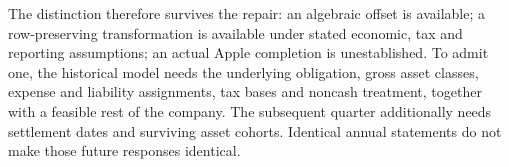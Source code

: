 The distinction therefore survives the repair: an algebraic offset is
available; a row-preserving transformation is available under stated
economic, tax and reporting assumptions; an actual Apple completion is
unestablished. To admit one, the historical model needs the underlying
obligation, gross asset classes, expense and liability assignments, tax
bases and noncash treatment, together with a feasible rest of the company.
The subsequent quarter additionally needs settlement dates and surviving
asset cohorts. Identical annual statements do not make those future
responses identical.
